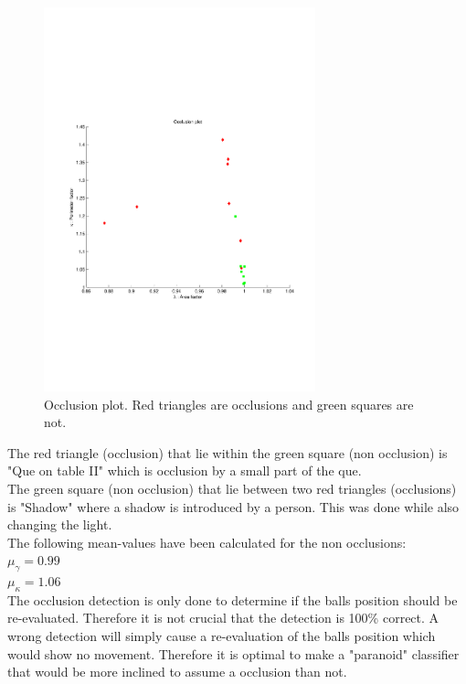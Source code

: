 \begin{figure}[H]
\begin{center}
\leavevmode
\includegraphics[width=0.7\textwidth]{images/occlusion_plot}
\end{center}
\caption{Occlusion plot. Red triangles are occlusions and green squares are not.}
\label{fig:occlusion_plot}
\end{figure}

The red triangle (occlusion) that lie within the green square (non occlusion) is "Que on table II" which is occlusion by a small part of the que. \\
The green square (non occlusion) that lie between two red triangles (occlusions) is "Shadow" where a shadow is introduced by a person. This was done while also changing the light.\\

The following mean-values have been calculated for the non occlusions:\\

$\mu_{\gamma} = 0.99$\\
$\mu_{\kappa} = 1.06$\\

The occlusion detection is only done to determine if the balls position should be re-evaluated. Therefore it is not crucial that the detection is 100\% correct. A wrong detection will simply cause a re-evaluation of the balls position which would show no movement. Therefore it is optimal to make a "paranoid" classifier that would be more inclined to assume a occlusion than not.\\

